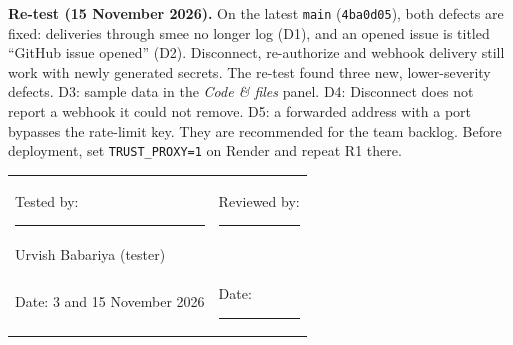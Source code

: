 \documentclass[11pt,a4paper]{article}
\begin{document}
\medskip\noindent\textbf{Re-test (15 November 2026).} On the latest \texttt{main} (\texttt{4ba0d05}), both defects are fixed:
deliveries through smee no longer log  (D1), and an opened issue is titled
``GitHub issue opened'' (D2). Disconnect, re-authorize and webhook delivery still work with newly generated secrets.
The re-test found three new, lower-severity defects. D3: sample data in the \emph{Code \& files} panel. D4: Disconnect does not report
a webhook it could not remove. D5: a forwarded address with a port bypasses the rate-limit key. They are recommended for the team backlog.
Before deployment, set \texttt{TRUST\_PROXY=1} on Render and repeat R1 there.

\vspace{1.2cm}
\noindent
\begin{tabularx}{\linewidth}{X X}
  Tested by: \rule{5cm}{0.4pt} & Reviewed by: \rule{5cm}{0.4pt} \\[2pt]
  Urvish Babariya (tester) & \\[14pt]
  Date: 3 and 15 November 2026 & Date: \rule{3.5cm}{0.4pt} \\
\end{tabularx}
\end{document}
